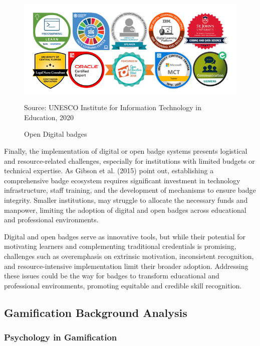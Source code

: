 \begin{figure}[htbp]
 \centering
 \includegraphics[width=14cm]{Media/Open_badges_examples.png}
 \caption{Open Digital badges}
 \label{fig:badgeExamples}
 {\raggedright \small{Source: UNESCO Institute for Information Technology in Education, 2020}\par}
\end{figure}
Finally, the implementation of digital or open badge systems presents logistical and resource-related challenges, especially for institutions with limited budgets or technical expertise. 
As Gibson et al. (2015)\cite{GibsonBadges} point out, establishing a comprehensive badge ecosystem requires significant investment in technology infrastructure, staff training, and the development of mechanisms to ensure badge integrity. Smaller institutions, may struggle to allocate the necessary funds and manpower, limiting the adoption of digital and open badges across educational and professional environments.

Digital and open badges serve as innovative tools, but while their potential for motivating learners and complementing traditional credentials is promising, challenges such as overemphasis on extrinsic motivation, inconsistent recognition, and resource-intensive implementation limit their broader adoption. 
Addressing these issues could be the way for badges to transform educational and professional environments, promoting equitable and credible skill recognition.\\
%
\subsection{Gamification Background Analysis}
%
\subsubsection{Psychology in Gamification}

